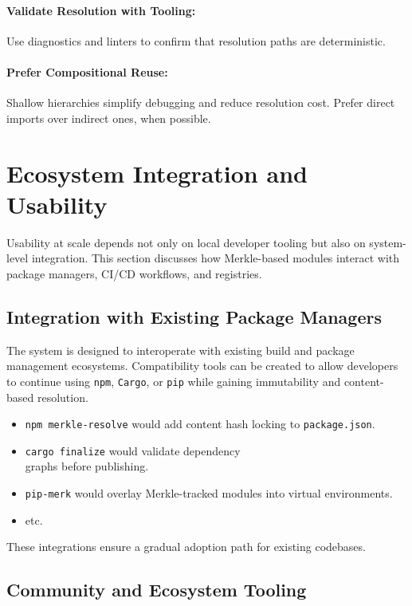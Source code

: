 \documentclass[sigplan,screen]{acmart}
\begin{document}
\paragraph{Validate Resolution with Tooling:} Use diagnostics and linters to confirm that resolution paths are deterministic.

\paragraph{Prefer Compositional Reuse:} Shallow hierarchies simplify debugging and reduce resolution cost. Prefer direct imports over indirect ones, when possible.

\section{Ecosystem Integration and Usability}
\label{sec:ecosystem}

Usability at scale depends not only on local developer tooling but also on system-level integration. This section discusses how Merkle-based modules interact with package managers, CI/CD workflows, and registries.

\subsection{Integration with Existing Package Managers}

The system is designed to interoperate with existing build and package management ecosystems. Compatibility tools can be created to allow developers to continue using \texttt{npm}, \texttt{Cargo}, or \texttt{pip} while gaining immutability and content-based resolution.

\begin{itemize}
  \item \texttt{npm merkle-resolve} would add content hash locking to \texttt{package.json}.
  \item \texttt{cargo finalize} would validate dependency \\graphs before publishing.
  \item \texttt{pip-merk} would overlay Merkle-tracked modules into virtual environments.
  \item etc.
\end{itemize}

These integrations ensure a gradual adoption path for existing codebases.

\subsection{Community and Ecosystem Tooling}
\end{document}
